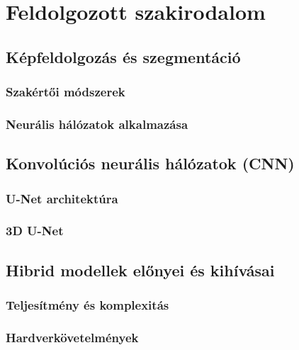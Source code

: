 \chapter{Feldolgozott szakirodalom}  %

\section{Képfeldolgozás és szegmentáció}  %

\subsection{Szakértői módszerek}  %

\subsection{Neurális hálózatok alkalmazása}  %

\section{Konvolúciós neurális hálózatok (CNN)}  %

\subsection{U-Net architektúra}  %

\subsection{3D U-Net}  %

\section{Hibrid modellek előnyei és kihívásai}  %

\subsection{Teljesítmény és komplexitás}  %

\subsection{Hardverkövetelmények}  %
